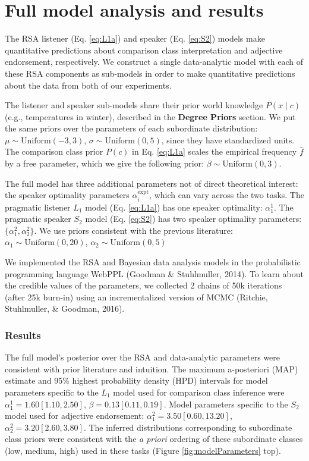 \documentclass[doc]{apa6}
\begin{document}
\section{Full model analysis and results}

The RSA listener (Eq. \ref{eq:L1a}) and speaker (Eq. \ref{eq:S2}) models make quantitative predictions about comparison class interpretation and adjective endorsement, respectively. We construct a single data-analytic model with each of these RSA components as sub-models in order to make quantitative predictions about the data from both of our experiments.

The listener and speaker sub-models share their prior world knowledge \(P(x \mid c)\) (e.g., temperatures in winter), described in the \textbf{Degree Priors} section. We put the same priors over the parameters of each subordinate distribution:
\(\mu \sim \text{Uniform}(-3, 3)\), \(\sigma \sim \text{Uniform}(0, 5)\), since they have standardized units. The comparison class prior \(P(c)\) in Eq. \ref{eq:L1a} scales the empirical frequency \(\hat{f}\) by a free parameter, which we give the following prior: \(\beta \sim \text{Uniform}(0, 3)\).

The full model has three additional parameters not of direct theoretical interest: the speaker optimality parameters \(\alpha^\text{expt}_{i}\), which can vary across the two tasks. The pragmatic listener \(L_1\) model (Eq. \ref{eq:L1a}) has one speaker optimality: \(\alpha^\text{1}_{1}\). The pragmatic speaker \(S_2\) model (Eq. \ref{eq:S2}) has two speaker optimality parameters: \(\{\alpha^\text{2}_{1}, \alpha^\text{2}_{2}\}\). We use priors consistent with the previous literature: \(\alpha_1 \sim \text{Uniform}(0, 20)\), \(\alpha_2 \sim \text{Uniform}(0, 5)\)

We implemented the RSA and Bayesian data analysis models in the probabilistic programming language WebPPL (Goodman \& Stuhlmuller, 2014). To learn about the credible values of the parameters, we collected 2 chains of 50k iterations (after 25k burn-in) using an incrementalized version of MCMC (Ritchie, Stuhlmuller, \& Goodman, 2016).

\subsubsection{Results}

The full model's posterior over the RSA and data-analytic parameters were consistent with prior literature and intuition. The maximum a-posteriori (MAP) estimate and 95\% highest probability density (HPD) intervals for model parameters specific to the \(L_1\) model used for comparison class inference were \(\alpha^{1}_{1} = 1.60 [1.10, 2.50]\),
\(\beta = 0.13 [0.11, 0.19]\). Model parameters specific to the \(S_2\) model used for adjective endorsement:
\(\alpha^{2}_{1} = 3.50 [0.60, 13.20]\), \(\alpha^{2}_{2} = 3.20 [2.60, 3.80]\). The inferred distributions corresponding to subordinate class priors were consistent with the \emph{a priori} ordering of these subordinate classes (low, medium, high) used in these tasks (Figure \ref{fig:modelParameters} top).
\end{document}
